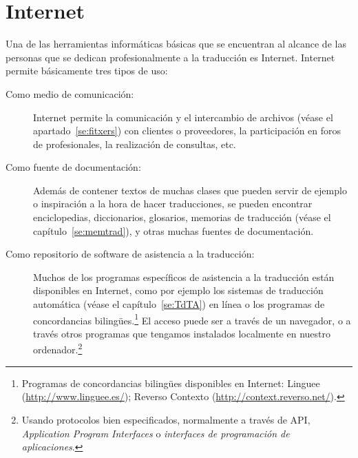 \chapter{Internet} \label{se:Internet}  

Una de las herramientas informáticas básicas que se encuentran al alcance de las personas que se dedican profesionalmente a la traducción es Internet. Internet permite básicamente tres tipos de uso: \begin{description} \item[Como medio de comunicación:] Internet permite la comunicación y el intercambio de archivos (véase el apartado~\ref{se:fitxers}) con clientes o proveedores, la participación en foros de profesionales, la realización de consultas, etc. \item[Como fuente de documentación:] Además de contener textos de muchas clases que pueden servir de ejemplo o inspiración a la hora de hacer traducciones, se pueden encontrar enciclopedias, diccionarios, glosarios, memorias de traducción (véase el capítulo~\ref{se:memtrad}), y otras muchas fuentes de documentación. \item[Como repositorio de software de asistencia a la traducción:] Muchos de los programas específicos de asistencia a la traducción están disponibles en Internet, como por ejemplo los sistemas de traducción automática (véase el capítulo~\ref{se:TdTA}) en línea o los programas de concordancias bilingües.\footnote{Programas de concordancias bilingües disponibles en Internet: Linguee (\url{http://www.linguee.es/}); Reverso Contexto (\url{http://context.reverso.net/}).} El acceso puede ser a través de un navegador, o a través otros programas que tengamos instalados localmente en nuestro ordenador.\footnote{Usando protocolos bien especificados, normalmente a través de API, \emph{Application Program Interfaces} o \emph{interfaces de programación de aplicaciones}.} \end{description} 

